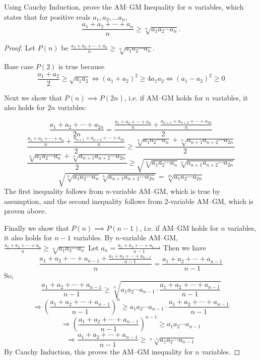 \begin{exercise}{}{}
Using Cauchy Induction, prove the AM--GM Inequality for $n$ variables, which states that for positive reals $a_1, a_2,\dots a_n$,
\[ \frac{a_1+a_2+\cdots+a_n}{n}\ge\sqrt[n]{a_1a_2\cdots a_n}. \]
\end{exercise}
\begin{proof}
Let $P(n)$ be $\frac{a_1+a_2+\cdots+a_n}{n}\ge\sqrt[n]{a_1a_2\cdots a_n}$.

Base case $P(2)$ is true because\[\frac{a_1+a_2}{2}\ge\sqrt{a_1a_2} \iff (a_1+a_2)^2\ge 4a_1a_2 \iff (a_1-a_2)^2\ge0\]

Next we show that $P(n)\implies P(2n)$, i.e. if AM--GM holds for $n$ variables, it also holds for $2n$ variables:

\[\frac{a_1+a_2+\cdots+a_{2n}}{2n}=\frac{\frac{a_1+a_2+\cdots+a_n}{n}+\frac{a_{n+1}+a_{n+2}+\cdots+a_{2n}}{n}}{2}\]\[\frac{\frac{a_1+a_2+\cdots+a_n}{n}+\frac{a_{n+1}+a_{n+2}+\cdots+a_{2n}}{n}}{2}\ge\frac{\sqrt[n]{a_1a_2\cdots a_n}+\sqrt[n]{a_{n+1}a_{n+2}\cdots a_{2n}}}{2}\]\[\frac{\sqrt[n]{a_1a_2\cdots a_n}+\sqrt[n]{a_{n+1}a_{n+2}\cdots a_{2n}}}{2}\ge\sqrt{\sqrt[n]{a_1a_2\cdots a_n}\sqrt[n]{a_{n+1}a_{n+2}\cdots a_{2n}}}\]\[\sqrt{\sqrt[n]{a_1a_2\cdots a_n}\sqrt[n]{a_{n+1}a_{n+2}\cdots a_{2n}}}=\sqrt[2n]{a_1a_2\cdots a_{2n}}\]
The first inequality follows from $n$-variable AM--GM, which is true by assumption, and the second inequality follows from 2-variable AM--GM, which is proven above.

Finally we show that $P(n)\implies P(n-1)$, i.e. if AM--GM holds for $n$ variables, it also holds for $n-1$ variables. By $n$-variable AM--GM, $\frac{a_1+a_2+\cdots+a_n}{n}\ge\sqrt[n]{a_1a_2\cdots a_n}$ Let $a_n=\frac{a_1+a_2+\cdots+a_{n-1}}{n-1}$ Then we have\[\frac{a_1+a_2+\cdots+a_{n-1}+\frac{a_1+a_2+\cdots+a_{n-1}}{n-1}}{n}=\frac{a_1+a_2+\cdots+a_{n-1}}{n-1}\]So,\[\frac{a_1+a_2+\cdots+a_{n-1}}{n-1}\ge\sqrt[n]{a_1a_2\cdots a_{n-1}\cdot \frac{a_1+a_2+\cdots+a_{n-1}}{n-1}}\]\[\Rightarrow\left(\frac{a_1+a_2+\cdots+a_{n-1}}{n-1}\right)^n\ge a_1a_2\cdots a_{n-1}\cdot \frac{a_1+a_2+\cdots+a_{n-1}}{n-1}\]\[\Rightarrow\left(\frac{a_1+a_2+\cdots+a_{n-1}}{n-1}\right)^{n-1}\ge a_1a_2\cdots a_{n-1}\]\[\Rightarrow \frac{a_1+a_2+\cdots+a_{n-1}}{n-1}\ge\sqrt[n-1]{a_1a_2\cdots a_{n-1}}\]
By Cauchy Induction, this proves the AM--GM inequality for $n$ variables.
\end{proof}

